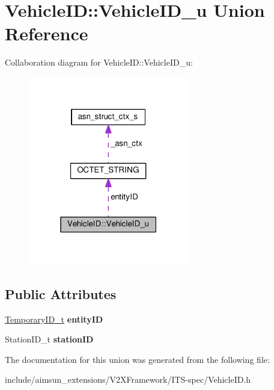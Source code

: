 \hypertarget{unionVehicleID_1_1VehicleID__u}{}\section{Vehicle\+ID\+:\+:Vehicle\+I\+D\+\_\+u Union Reference}
\label{unionVehicleID_1_1VehicleID__u}


Collaboration diagram for Vehicle\+ID\+:\+:Vehicle\+I\+D\+\_\+u\+:\nopagebreak
\begin{figure}[H]
\begin{center}
\leavevmode
\includegraphics[width=199pt]{unionVehicleID_1_1VehicleID__u__coll__graph}
\end{center}
\end{figure}
\subsection*{Public Attributes}
\begin{DoxyCompactItemize}
\item 
\hyperlink{structOCTET__STRING}{Temporary\+I\+D\+\_\+t} {\bfseries entity\+ID}\hypertarget{unionVehicleID_1_1VehicleID__u_acd23038a25d02060efd62f05fc14b558}{}\label{unionVehicleID_1_1VehicleID__u_acd23038a25d02060efd62f05fc14b558}

\item 
Station\+I\+D\+\_\+t {\bfseries station\+ID}\hypertarget{unionVehicleID_1_1VehicleID__u_a72bc6511aee17afe2dab9f2e142c4328}{}\label{unionVehicleID_1_1VehicleID__u_a72bc6511aee17afe2dab9f2e142c4328}

\end{DoxyCompactItemize}


The documentation for this union was generated from the following file\+:\begin{DoxyCompactItemize}
\item 
include/aimsun\+\_\+extensions/\+V2\+X\+Framework/\+I\+T\+S-\/spec/Vehicle\+I\+D.\+h\end{DoxyCompactItemize}
